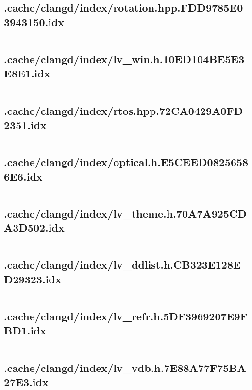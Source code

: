 \subsection{.cache/clangd/index/rotation.hpp.FDD9785E03943150.idx}
\inputminted[linenos,tabsize=2,breaklines, breakanywhere]{c}{rotation.hpp.FDD9785E03943150.idx}
\pagebreak

\subsection{.cache/clangd/index/lv_win.h.10ED104BE5E3E8E1.idx}
\inputminted[linenos,tabsize=2,breaklines, breakanywhere]{c}{lv_win.h.10ED104BE5E3E8E1.idx}
\pagebreak

\subsection{.cache/clangd/index/rtos.hpp.72CA0429A0FD2351.idx}
\inputminted[linenos,tabsize=2,breaklines, breakanywhere]{c}{rtos.hpp.72CA0429A0FD2351.idx}
\pagebreak

\subsection{.cache/clangd/index/optical.h.E5CEED08256586E6.idx}
\inputminted[linenos,tabsize=2,breaklines, breakanywhere]{c}{optical.h.E5CEED08256586E6.idx}
\pagebreak

\subsection{.cache/clangd/index/lv_theme.h.70A7A925CDA3D502.idx}
\inputminted[linenos,tabsize=2,breaklines, breakanywhere]{c}{lv_theme.h.70A7A925CDA3D502.idx}
\pagebreak

\subsection{.cache/clangd/index/lv_ddlist.h.CB323E128ED29323.idx}
\inputminted[linenos,tabsize=2,breaklines, breakanywhere]{c}{lv_ddlist.h.CB323E128ED29323.idx}
\pagebreak

\subsection{.cache/clangd/index/lv_refr.h.5DF3969207E9FBD1.idx}
\inputminted[linenos,tabsize=2,breaklines, breakanywhere]{c}{lv_refr.h.5DF3969207E9FBD1.idx}
\pagebreak

\subsection{.cache/clangd/index/lv_vdb.h.7E88A77F75BA27E3.idx}
\inputminted[linenos,tabsize=2,breaklines, breakanywhere]{c}{lv_vdb.h.7E88A77F75BA27E3.idx}
\pagebreak

